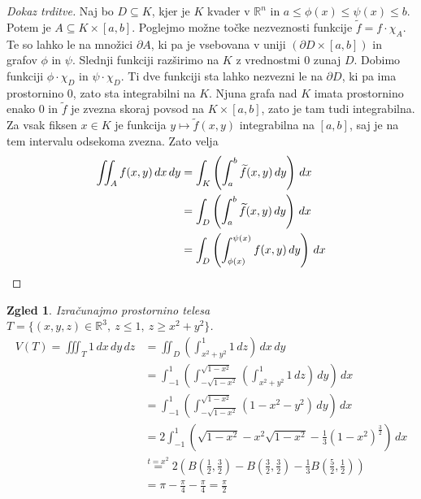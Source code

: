 \documentclass[10pt, a4paper]{article}
\newtheorem{zgled}{Zgled}[section]
\newenvironment{noticeC}{%
  \tcolorbox[%
  notitle,
  empty,
  enhanced,  %
  breakable,
  coltext=black, 
  fontupper=\rmfamily,
  parbox=false,
  noparskip,
  sharp corners,
  boxrule=-1pt,  %
  frame hidden,
  left=7pt,  %
  right=7pt,
  top=5pt,
  bottom=5pt,
  before skip=2.5ex plus 2pt,
  after skip=2.5ex plus 2pt,
  overlay unbroken and last={%
  },
  ]}
{\endtcolorbox}
\newenvironment{dokaz}%
  {\begin{noticeC}\begin{proof}}%
  {\end{proof}\end{noticeC}}
\newcommand{\R}{\mathbb {R}}
\begin{document}
\begin{dokaz}[Dokaz trditve]
    Naj bo $D \subseteq K$, kjer je $K$ kvader v $\R^n$ 
    in $a \leq \phi(x) \leq \psi (x) \leq b$.
    Potem je $A \subseteq K \times [a, b]$.
    Poglejmo možne točke nezveznosti funkcije $\widetilde{f} = f \cdot \chi_A$.
    Te so lahko le na množici $\partial A$, ki pa je vsebovana v uniji $(\partial D \times [a, b])$
    in grafov $\phi$ in $\psi$. Slednji funkciji razširimo na $K$ z vrednostmi $0$ zunaj $D$.
    Dobimo funkciji $\phi \cdot \chi_D$ in $\psi \cdot \chi_D$.
    Ti dve funkciji sta lahko nezvezni le na $\partial D$, ki pa ima prostornino $0$, zato sta integrabilni na $K$.
    Njuna grafa nad $K$ imata prostornino enako $0$ in $\widetilde{f}$ je zvezna skoraj povsod na $K \times [a, b]$,
    zato je tam tudi integrabilna.
    Za vsak fiksen $x \in K$ je funkcija $y \mapsto \widetilde{f} (x, y)$ integrabilna na $[a, b]$,
    saj je na tem intervalu odsekoma zvezna. Zato velja 
    \begin{align*}
        \iint_A f(x, y)\, dx\, dy &= \int_K \left(\int_a ^b \widetilde{f} (x, y)\, dy\right)\, dx\\
        &= \int_D \left(\int_a ^b \widetilde{f} (x, y)\, dy\right)\, dx\\
        &= \int_D \left(\int_{\phi(x)} ^{\psi(x)} f(x, y)\, dy\right)\, dx \qedhere
    \end{align*}
\end{dokaz}

\begin{zgled}\label{zgl:4}
    Izračunajmo prostornino telesa $T = \{(x, y, z) \in \R^3,\ z \leq 1,\ z \geq x^2 + y^2\}$.
    \begin{align*}
        V(T) = \iiint_T 1 \, dx\, dy\, dz &= \iint_D \left(\int_{x^2 + y^2} ^1 1\, dz\right)\, dx\, dy\\
        &= \int_{-1} ^1 \left(\int_{-\sqrt{1 - x^2}} ^{\sqrt{1 - x^2}} \left(\int_{x^2 + y^2} ^1 1\, dz\right)\, dy\right)\, dx\\
        &= \int_{-1} ^1 \left(\int_{-\sqrt{1 - x^2}} ^{\sqrt{1 - x^2}} (1 - x^2 - y^2)\, dy\right)\, dx\\
        &= 2 \int_{-1} ^1 \left(\sqrt{1 - x^2} - x^2 \sqrt{1 - x^2} -\frac{1}{3} (1 - x^2)^{\frac{3}{2}}\right)\, dx\\
        &\stackrel{t = x^2}{=} 2 \left(B\left(\frac{1}{2}, \frac{3}{2}\right) - B\left(\frac{3}{2}, \frac{3}{2}\right) - \frac{1}{3} B\left(\frac{5}{2}, \frac{1}{2}\right) \right)\\
        &= \pi - \frac{\pi}{4} - \frac{\pi}{4} = \frac{\pi}{2}
    \end{align*}
\end{zgled}
\end{document}
